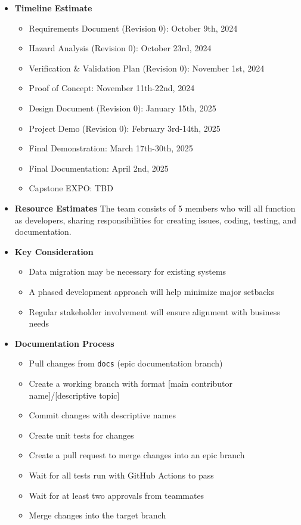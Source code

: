 \documentclass[12pt]{article}
\begin{document}
\begin{itemize}
\begin{itemize}
  \end{itemize}
  \item \textbf{Timeline Estimate}
    \begin{itemize}
        \item Requirements Document (Revision 0): October 9th, 2024
        \item Hazard Analysis (Revision 0): October 23rd, 2024
        \item Verification \& Validation Plan (Revision 0): November 1st, 2024
        \item Proof of Concept: November 11th-22nd, 2024
        \item Design Document (Revision 0): January 15th, 2025
        \item Project Demo (Revision 0): February 3rd-14th, 2025
        \item Final Demonstration: March 17th-30th, 2025
        \item Final Documentation: April 2nd, 2025
        \item Capstone EXPO: TBD
    \end{itemize}
    
  \item \textbf{Resource Estimates}
  The team consists of 5 members who will all function as developers, sharing responsibilities for creating issues, coding, testing, and documentation.

  \item \textbf{Key Consideration}
    \begin{itemize}
        \item Data migration may be necessary for existing systems
        \item A phased development approach will help minimize major setbacks
        \item Regular stakeholder involvement will ensure alignment with business needs
    \end{itemize}

  \item \textbf{Documentation Process}
    \begin{itemize}
        \item Pull changes from \texttt{docs} (epic documentation branch)
        \item Create a working branch with format [main contributor name]/[descriptive topic]
        \item Commit changes with descriptive names
        \item Create unit tests for changes
        \item Create a pull request to merge changes into an epic branch
        \item Wait for all tests run with GitHub Actions to pass
        \item Wait for at least two approvals from teammates
        \item Merge changes into the target branch
    \end{itemize}
  
\end{itemize}
\end{document}
